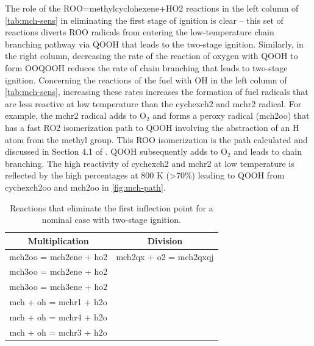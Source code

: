 \documentclass[12pt, letterpaper]{article}
\begin{document}
The role of the ROO=methylcyclohexene+HO2 reactions in the left column of
\autoref{tab:mch-sens} in eliminating the first stage of ignition is clear --
this set of reactions diverts ROO radicals from entering the low-temperature
chain branching pathway via QOOH that leads to the two-stage ignition.
Similarly, in the right column, decreasing the rate of the reaction of oxygen
with QOOH to form OOQOOH reduces the rate of chain branching that leads to
two-stage ignition. Concerning the reactions of the fuel with OH in the left
column of \autoref{tab:mch-sens}, increasing these rates increases the
formation of fuel radicals that are less reactive at low temperature than the
cychexch2 and mchr2 radical. For example, the mchr2 radical adds to O$_2$ and
forms a peroxy radical (mch2oo) that has a fast RO2 isomerization path to QOOH
involving the abstraction of an H atom from the methyl group. This ROO
isomerization is the path calculated and discussed in Section 4.1 of
\cite{Weber2014}. QOOH subsequently adds to O$_2$ and leads to chain branching.
The high reactivity of cychexch2 and mchr2 at low temperature is reflected by
the high percentages at 800 K (>70\%) leading to QOOH from cychexch2oo and
mch2oo in \autoref{fig:mch-path}.

\begin{table}
    \centering
    \caption{Reactions that eliminate the first inflection point for a nominal
    case with two-stage ignition.}
    \label{tab:mch-sens}
    \begin{tabular}{c c}
    \toprule
    Multiplication & Division \\
    \midrule
    mch2oo = mch2ene + ho2 & mch2qx + o2 = mch2qxqj \\
    mch3oo = mch2ene + ho2 & \\
    mch3oo = mch3ene + ho2 & \\
    mch + oh = mchr1 + h2o & \\
    mch + oh = mchr4 + h2o & \\
    mch + oh = mchr3 + h2o & \\
    \bottomrule
    \end{tabular}
\end{table}
\end{document}
